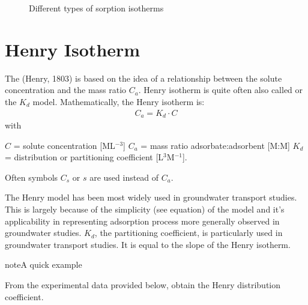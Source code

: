 \documentclass[letterpaper,10pt,english]{jupyterBook}
\begin{document}
\begin{figure}[htbp]
\centering
\capstart

\noindent{}
\caption{Different types of sorption isotherms}\label{\detokenize{content/transport/L10/22_reactive_transport:sorption-type}}\end{figure}


\section{Henry Isotherm}
\label{\detokenize{content/transport/L10/22_reactive_transport:henry-isotherm}}
\sphinxAtStartPar
The  (Henry, 1803) is based on the idea of a  relationship between the solute concentration  and the  mass ratio \(C_a\). Henry isotherm is quite often also called  or the \(K_d\) model. Mathematically, the Henry isotherm is:
\begin{equation*}
\begin{split}
C_a = K_d \cdot C
\end{split}
\end{equation*}
\sphinxAtStartPar
with

\sphinxAtStartPar
\(C\) = solute concentration {[}ML\(^{-3}\){]}
\(C_a\) = mass ratio adsorbate:adsorbent {[}M:M{]}
\(K_d\) = distribution or partitioning coefficient {[}L\(^3\)M\(^{-1}\){]}.

\sphinxAtStartPar
Often symbols \(C_s\) or \(s\) are used instead of \(C_a\).

\sphinxAtStartPar
The Henry model has been most widely used in groundwater transport studies. This is largely because of the simplicity (see equation) of the model and it’s applicability in representing adsorption process more generally observed in groundwater studies. \(K_d\), the partitioning coefficient, is particularly used in groundwater transport studies. It is equal to the slope of the Henry isotherm.

\begin{sphinxadmonition}{note}{A quick example}

\sphinxAtStartPar
From the experimental data provided below, obtain the Henry distribution coefficient.
\end{sphinxadmonition}
\end{document}
